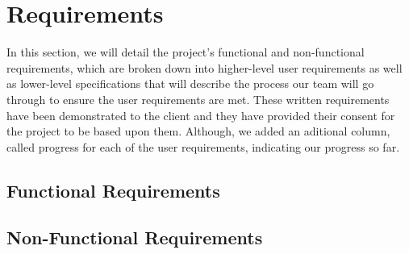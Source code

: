 \chapter{Requirements} \label{ch:Requirements}

In this section, we will detail the project's functional and non-functional requirements, which are broken down into
higher-level user requirements as well as lower-level specifications that will describe the process our team will go
through to ensure the user requirements are met. These written requirements have been demonstrated to the client and they have provided their consent for the project to be based upon them. Although, we added an aditional column, called progress for each of the user requirements, indicating our progress so far.

\section{Functional Requirements} \label{sec:func_requirements}

\vspace{1em}  \vspace{5em}

\section{Non-Functional Requirements} \label{sec:non_func_requirements}

\vspace{1em}  \vspace{5em}
